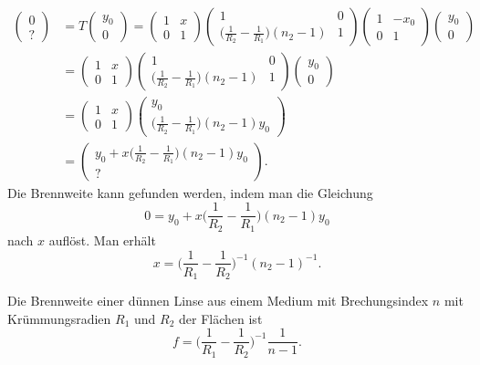 \begin{align*}
\begin{pmatrix}
0\\?
\end{pmatrix}
&=
T
\begin{pmatrix}y_0\\0\end{pmatrix}
=
\begin{pmatrix}
1&x\\
0&1
\end{pmatrix}
\begin{pmatrix}
1&0\\
\displaystyle
\biggl(\frac1{R_2}-\frac1{R_1}\biggr)(n_2-1)
&1
\end{pmatrix}
\begin{pmatrix}
1&-x_0\\
0&1
\end{pmatrix}
\begin{pmatrix}y_0\\0\end{pmatrix}
\\
&=
\begin{pmatrix}
1&x\\
0&1
\end{pmatrix}
\begin{pmatrix}
1&0\\
\displaystyle
\biggl(\frac1{R_2}-\frac1{R_1}\biggr)(n_2-1)
&1
\end{pmatrix}
\begin{pmatrix}y_0\\0\end{pmatrix}
\\
&=
\begin{pmatrix}
1&x\\
0&1
\end{pmatrix}
\begin{pmatrix}y_0
\\
\displaystyle\biggl(\frac1{R_2}-\frac1{R_1}\biggr)(n_2-1)y_0
\end{pmatrix}
\\
&=
\begin{pmatrix}
y_0 + \displaystyle x\biggl(\frac1{R_2}-\frac1{R_1}\biggr)(n_2-1)y_0
\\
?
\end{pmatrix}.
\end{align*}
Die Brennweite kann gefunden werden, indem man die Gleichung
\[
0=
y_0 + \displaystyle x\biggl(\frac1{R_2}-\frac1{R_1}\biggr)(n_2-1)y_0
\]
nach $x$ auflöst.
Man erhält
\[
x
=
\biggl(
\frac{1}{R_1}-\frac{1}{R_2}
\biggr)^{-1}
(n_2-1)^{-1}.
\]
\begin{satz}
Die Brennweite einer dünnen Linse aus einem Medium mit Brechungsindex $n$ 
mit Krümmungsradien $R_1$ und $R_2$ der Flächen ist
\[
f = \biggl(\frac{1}{R_1}-\frac{1}{R_2}\biggr)^{-1} \frac{1}{n-1}.
\]
\end{satz}

